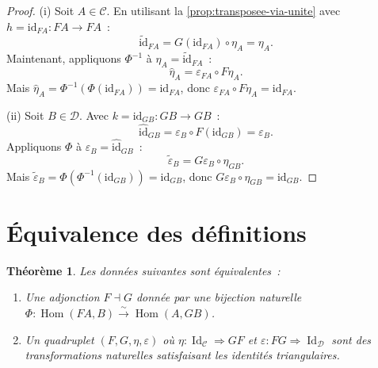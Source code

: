 \documentclass[a4paper,12pt]{book}
\DeclareMathOperator{\Hom}{Hom}
\DeclareMathOperator{\Id}{Id}
\newcommand{\id}{\mathrm{id}}
\newtheorem{theoreme}{Théorème}[chapter]
\begin{document}
\begin{proof}
(i) Soit $A\in\mathcal{C}$. En utilisant la \autoref{prop:transposee-via-unite}
avec $h=\id_{FA}\colon FA\to FA$~:
\[
    \tilde{\id}_{FA} = G(\id_{FA})\circ\eta_A = \eta_A.
\]
Maintenant, appliquons $\Phi^{-1}$ à $\eta_A = \tilde{\id}_{FA}$~:
\[
    \hat{\eta}_A = \varepsilon_{FA}\circ F\eta_A.
\]
Mais $\hat{\eta}_A = \Phi^{-1}(\Phi(\id_{FA})) = \id_{FA}$,
donc $\varepsilon_{FA}\circ F\eta_A = \id_{FA}$.

(ii) Soit $B\in\mathcal{D}$. Avec $k=\id_{GB}\colon GB\to GB$~:
\[
    \hat{\id}_{GB} = \varepsilon_B\circ F(\id_{GB}) = \varepsilon_B.
\]
Appliquons $\Phi$ à $\varepsilon_B = \hat{\id}_{GB}$~:
\[
    \tilde{\varepsilon}_B = G\varepsilon_B\circ\eta_{GB}.
\]
Mais $\tilde{\varepsilon}_B = \Phi(\Phi^{-1}(\id_{GB})) = \id_{GB}$,
donc $G\varepsilon_B\circ\eta_{GB} = \id_{GB}$.
\end{proof}


\section{Équivalence des définitions}\label{sec:equivalence-def-adjonctions}

\begin{theoreme}\label{thm:equivalence-adjonctions}
Les données suivantes sont équivalentes~:
\begin{enumerate}[label=(\alph*)]
\item Une adjonction $F\dashv G$ donnée par une bijection naturelle
      $\Phi\colon\Hom(FA,B)\xrightarrow{\sim}\Hom(A,GB)$.
\item Un quadruplet $(F,G,\eta,\varepsilon)$ où
      $\eta\colon\Id_\mathcal{C}\Rightarrow GF$ et
      $\varepsilon\colon FG\Rightarrow\Id_\mathcal{D}$
      sont des transformations naturelles satisfaisant les
      identités triangulaires.
\end{enumerate}
\end{theoreme}
\end{document}
